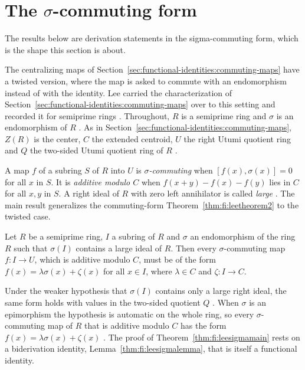 \section{The $\sigma$-commuting form}\label{sec:functional-identities:centralizers-multipliers}

The results below are derivation statements in the sigma-commuting form, which is the shape this section is about.

The centralizing maps of
Section~\ref{sec:functional-identities:commuting-maps} have a twisted
version, where the map is asked to commute with an endomorphism instead of
with the identity. Lee carried the characterization of
Section~\ref{sec:functional-identities:commuting-maps} over to this
setting and recorded it for semiprime rings
\cite[p.~2946]{LeeTK2001SigmaCommuting}. Throughout, $R$ is a semiprime
ring and $\sigma$ is an endomorphism of $R$
\cite[p.~2946]{LeeTK2001SigmaCommuting}. As in
Section~\ref{sec:functional-identities:commuting-maps}, $Z(R)$ is the
center, $C$ the extended centroid, $U$ the right Utumi quotient ring and
$Q$ the two-sided Utumi quotient ring of $R$
\cite[p.~2946]{LeeTK2001SigmaCommuting}.

A map $f$ of a subring $S$ of $R$ into $U$ is \emph{$\sigma$-commuting}
\cite[p.~2946]{LeeTK2001SigmaCommuting} when $[f(x),\sigma(x)]=0$ for all
$x$ in $S$. It is \emph{additive modulo $C$}
\cite[p.~2946]{LeeTK2001SigmaCommuting} when $f(x+y)-f(x)-f(y)$ lies in
$C$ for all $x,y$ in $S$. A right ideal of $R$ with zero left annihilator
is called \emph{large} \cite[p.~2946]{LeeTK2001SigmaCommuting}. The main
result generalizes the commuting-form Theorem~\ref{thm:fi:leetheorem2} to
the twisted case.

\begin{theorem}\label{thm:fi:leesigmamain}
Let $R$ be a semiprime ring, $I$ a subring of $R$ and $\sigma$ an
endomorphism of the ring $R$ such that $\sigma(I)$ contains a large ideal
of $R$. Then every $\sigma$-commuting map $f\colon I\to U$, which is
additive modulo $C$, must be of the form $f(x)=\lambda\sigma(x)+\zeta(x)$
for all $x\in I$, where $\lambda\in C$ and $\zeta\colon I\to C$.
\end{theorem}

Under the weaker hypothesis that $\sigma(I)$ contains only a large right
ideal, the same form holds with values in the two-sided quotient $Q$
\cite[Theorem~1, p.~2947]{LeeTK2001SigmaCommuting}. When $\sigma$ is an
epimorphism the hypothesis is automatic on the whole ring, so every
$\sigma$-commuting map of $R$ that is additive modulo $C$ has the form
$f(x)=\lambda\sigma(x)+\zeta(x)$
\cite[Corollary~1, p.~2948]{LeeTK2001SigmaCommuting}. The proof of
Theorem~\ref{thm:fi:leesigmamain} rests on a biderivation identity,
Lemma~\ref{thm:fi:leesigmalemma}, that is itself a functional identity.

